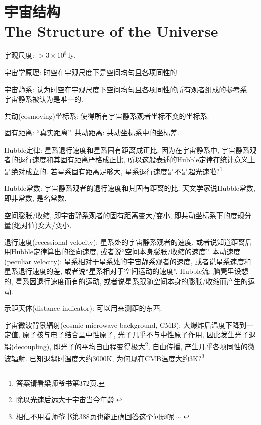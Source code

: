 \chapter{宇宙结构\\The Structure of the Universe}

宇观尺度: $>3\times10^{8}\,\text{ly}$.

宇宙学原理: 时空在宇观尺度下是空间均匀且各项同性的.

宇宙静系: 认为时空在宇观尺度下空间均匀且各项同性的所有观者组成的参考系. 宇宙静系被认为是唯一的.

共动(cosmoving)坐标系: 使得所有宇宙静系观者坐标不变的坐标系.

固有距离: ``真实距离''. 共动距离: 共动坐标系中的坐标差.

Hubble定律: 星系退行速度和星系固有距离成正比. 因为在宇宙静系中, 宇宙静系观者的退行速度和其固有距离严格成正比, 所以这般表述的Hubble定律在统计意义上是绝对成立的. 若星系固有距离足够大, 星系退行速度是不是超光速啦?\footnote{答案请看梁师爷书第372页.}

Hubble常数: 宇宙静系观者的退行速度和其固有距离的比. 天文学家说Hubble常数, 即非常数, 是名常数.

空间膨胀/收缩, 即宇宙静系观者的固有距离变大/变小, 即共动坐标系下的度规分量(绝对值)变大/变小.

退行速度(recessional velocity): 星系处的宇宙静系观者的速度, 或者说知道距离后用Hubble定律算出的径向速度, 或者说``空间本身膨胀/收缩的速度''. 本动速度(peculiar velocity): 星系相对于星系处的宇宙静系观者的速度, 或者说星系速度和星系退行速度的差, 或者说``星系相对于空间运动的速度''. Hubble流: 脑壳里设想的, 星系因退行速度而有的运动, 或者说星系跟随空间本身的膨胀/收缩而产生的运动.

示距天体(distance indicator): 可以用来测距的东西.

宇宙微波背景辐射(cosmic microwave background, CMB): 大爆炸后温度下降到一定值, 原子核与电子结合呈中性原子, 光子几乎不与中性原子作用, 因此发生光子退耦(decoupling), 即光子的平均自由程变得极大\footnote{除以光速后远大于宇宙当今年龄.}, 自由传播, 产生几乎各项同性的微波辐射. 已知退耦时温度大约$3000\text{K}$, 为何现在CMB温度大约$3\text{K}$?\footnote{相信不用看师爷书第388页也能正确回答这个问题呢$\!\sim$}
